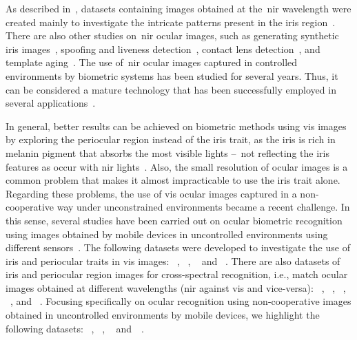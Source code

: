 \documentclass[journal]{IEEEtran}
\begin{document}
As described in~\cite{zanlorensi2019ocular}, datasets containing images obtained at the~\gls{nir} wavelength were created mainly to investigate the intricate patterns present in the iris region~\cite{Phillips2008, Phillips2010}.
There are also other studies on~\gls{nir} ocular images, such as generating synthetic iris images~\cite{Shah2006, Zuo2007}, spoofing and liveness detection~\cite{Ruiz-Albacete2008, Czajka2013, Gupta2014, Kohli2016}, contact lens detection~\cite{Baker2010, Kohli2013, Doyle2013, Doyle2015}, and template aging~\cite{Fenker2012, Baker2013}.
The use of~\gls{nir} ocular images captured in controlled environments by biometric systems has been studied for several years.
Thus, it can be considered a mature technology that has been successfully employed in several applications~\cite{bowyer2008survey, Phillips2008, Phillips2010, Proenca2017irina, Proenca2019segmentation}.

In general, better results can be achieved on biometric methods using \gls{vis} images by exploring the periocular region instead of the iris trait, as the iris is rich in melanin pigment that absorbs the most visible lights --~not reflecting the iris features as occur with \gls{nir} lights~\cite{bowyer2008survey}.
Also, the small resolution of ocular images is a common problem that makes it almost impracticable to use the iris trait alone.
Regarding these problems, the use of \gls{vis} ocular images captured in a non-cooperative way under unconstrained environments became a recent challenge. 
In this sense, several studies have been carried out on ocular biometric recognition using images obtained by mobile devices in uncontrolled environments using different sensors~\cite{DeMarsico2015, Raja2015, Rattani2016}.
The following datasets were developed to investigate the use of iris and periocular traits in \gls{vis} images: \upol~\cite{Dobes2004}, \ubirisvOne~\cite{Proenca2005}, \ubirisvTwo~\cite{Proenca2010} and \ubipr~\cite{Padole2012}.
There are also datasets of iris and periocular region images for cross-spectral recognition, i.e., match ocular images obtained at different wavelengths (\gls{nir} against \gls{vis} and vice-versa): \utiris~\cite{Hosseini2010}, \iiitdMSP~\cite{Sharma2014}, \polyu~\cite{Nalla2017}, \crossEyed~\cite{Sequeira2016, Sequeira2017}, and \qutMP~\cite{Algashaam2017}.
Focusing specifically on ocular recognition using non-cooperative images obtained in uncontrolled environments by mobile devices, we highlight the following datasets: \miche~\cite{DeMarsico2015}, \vssiris~\cite{Raja2015}, \csip~\cite{Santos2015} and~\visob~\cite{Rattani2016}.
\end{document}
